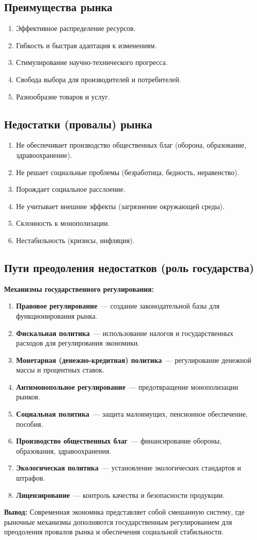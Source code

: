 \documentclass[12pt]{article}
\begin{document}
	\subsection{Преимущества рынка}
	\begin{enumerate}
		\item Эффективное распределение ресурсов.
		\item Гибкость и быстрая адаптация к изменениям.
		\item Стимулирование научно-технического прогресса.
		\item Свобода выбора для производителей и потребителей.
		\item Разнообразие товаров и услуг.
	\end{enumerate}
	
	\subsection{Недостатки (провалы) рынка}
	\begin{enumerate}
		\item Не обеспечивает производство общественных благ (оборона, образование, здравоохранение).
		\item Не решает социальные проблемы (безработица, бедность, неравенство).
		\item Порождает социальное расслоение.
		\item Не учитывает внешние эффекты (загрязнение окружающей среды).
		\item Склонность к монополизации.
		\item Нестабильность (кризисы, инфляция).
	\end{enumerate}
	
	\subsection{Пути преодоления недостатков (роль государства)}
	
	\textbf{Механизмы государственного регулирования:}
	\begin{enumerate}
		\item \textbf{Правовое регулирование}~--- создание законодательной базы для функционирования рынка.
		\item \textbf{Фискальная политика}~--- использование налогов и государственных расходов для регулирования экономики.
		\item \textbf{Монетарная (денежно-кредитная) политика}~--- регулирование денежной массы и процентных ставок.
		\item \textbf{Антимонопольное регулирование}~--- предотвращение монополизации рынков.
		\item \textbf{Социальная политика}~--- защита малоимущих, пенсионное обеспечение, пособия.
		\item \textbf{Производство общественных благ}~--- финансирование обороны, образования, здравоохранения.
		\item \textbf{Экологическая политика}~--- установление экологических стандартов и штрафов.
		\item \textbf{Лицензирование}~--- контроль качества и безопасности продукции.
	\end{enumerate}
	
	\textbf{Вывод:} Современная экономика представляет собой смешанную систему, где рыночные механизмы дополняются государственным регулированием для преодоления провалов рынка и обеспечения социальной стабильности.
\end{document}
